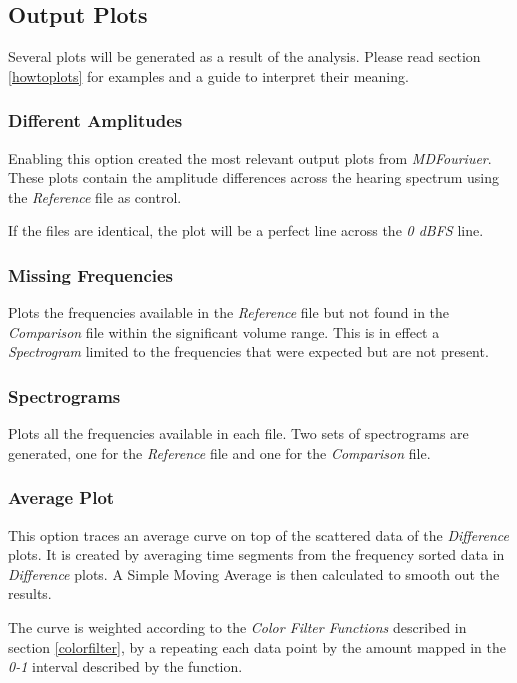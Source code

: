 \documentclass[10pt,a4paper]{report}
\begin{document}
\subsection{Output Plots}
\label{outputfiles}

Several plots will be generated as a result of the analysis. Please read section \ref{howtoplots} for examples and a guide to interpret their meaning.

\subsubsection{Different Amplitudes}

Enabling this option created the most relevant output plots from \textit{MDFouriuer}. These plots contain the amplitude differences across the hearing spectrum using the \textit{Reference} file as control.

If the files are identical, the plot will be a perfect line across the \textit{0 dBFS} line.

\subsubsection{Missing Frequencies} 

Plots the frequencies available in the \textit{Reference} file but not found in the \textit{Comparison} file within the significant volume range. This is in effect a \textit{Spectrogram} limited to the frequencies that were expected but are not present.
	
\subsubsection{Spectrograms}

Plots all the frequencies available in each file. Two sets of spectrograms are generated, one for the \textit{Reference} file and one for the \textit{Comparison} file.

\subsubsection{Average Plot}
\label{averaged}

This option traces an average curve on top of the scattered data of the \textit{Difference} plots. It is created by averaging time segments from the frequency sorted data in \textit{Difference} plots. A Simple Moving Average is then calculated to smooth out the results.

The curve is weighted according to the \textit{Color Filter Functions} described in section \ref{colorfilter}, by a repeating each data point by the amount mapped in the \textit{0-1} interval described by the function.
\end{document}
